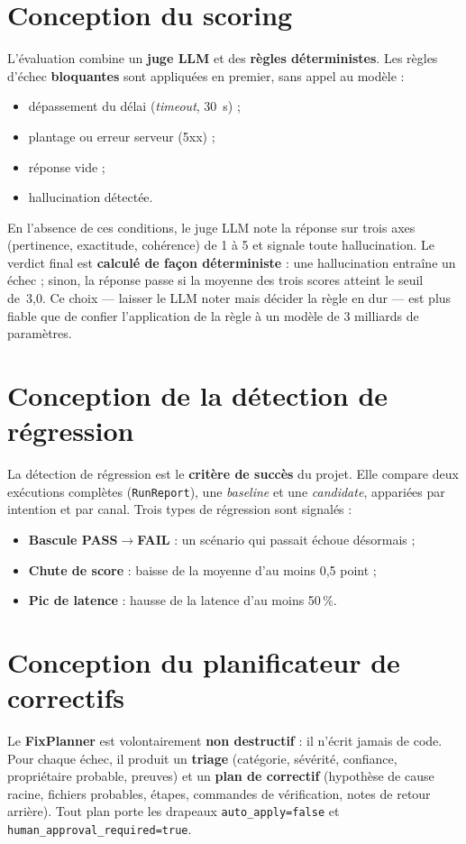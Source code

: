 \documentclass[12pt,a4paper,oneside]{report}
\begin{document}
\section{Conception du scoring}
L'évaluation combine un \textbf{juge LLM} et des \textbf{règles déterministes}. Les
règles d'échec \textbf{bloquantes} sont appliquées en premier, sans appel au modèle :
\begin{itemize}[leftmargin=*]
  \item dépassement du délai (\textit{timeout}, 30~s) ;
  \item plantage ou erreur serveur (5xx) ;
  \item réponse vide ;
  \item hallucination détectée.
\end{itemize}
En l'absence de ces conditions, le juge LLM note la réponse sur trois axes (pertinence,
exactitude, cohérence) de 1 à 5 et signale toute hallucination. Le verdict final est
\textbf{calculé de façon déterministe} : une hallucination entraîne un échec ; sinon, la
réponse passe si la moyenne des trois scores atteint le seuil de~3,0. Ce choix
— laisser le LLM noter mais décider la règle en dur — est plus fiable que de confier
l'application de la règle à un modèle de 3 milliards de paramètres.

\section{Conception de la détection de régression}
La détection de régression est le \textbf{critère de succès} du projet. Elle compare
deux exécutions complètes (\texttt{RunReport}), une \textit{baseline} et une
\textit{candidate}, appariées par intention et par canal. Trois types de régression
sont signalés :
\begin{itemize}[leftmargin=*]
  \item \textbf{Bascule PASS$\to$FAIL} : un scénario qui passait échoue désormais ;
  \item \textbf{Chute de score} : baisse de la moyenne d'au moins 0,5 point ;
  \item \textbf{Pic de latence} : hausse de la latence d'au moins 50\,\%.
\end{itemize}

\section{Conception du planificateur de correctifs}
Le \textbf{FixPlanner} est volontairement \textbf{non destructif} : il n'écrit jamais
de code. Pour chaque échec, il produit un \textbf{triage} (catégorie, sévérité,
confiance, propriétaire probable, preuves) et un \textbf{plan de correctif} (hypothèse
de cause racine, fichiers probables, étapes, commandes de vérification, notes de retour
arrière). Tout plan porte les drapeaux \texttt{auto\_apply=false} et
\texttt{human\_approval\_required=true}.
\end{document}
